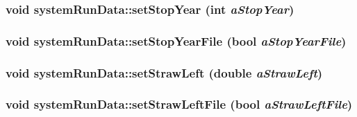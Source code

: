 \hypertarget{classsystem_run_data_afb3c83dc494b80a101de20b02225541c}{
\subsubsection[{setStopYear}]{\setlength{\rightskip}{0pt plus 5cm}void systemRunData::setStopYear (int {\em aStopYear})}}
\label{classsystem_run_data_afb3c83dc494b80a101de20b02225541c}
\hypertarget{classsystem_run_data_a673bf638a69369d131176b0a34085d4e}{
\subsubsection[{setStopYearFile}]{\setlength{\rightskip}{0pt plus 5cm}void systemRunData::setStopYearFile (bool {\em aStopYearFile})}}
\label{classsystem_run_data_a673bf638a69369d131176b0a34085d4e}
\hypertarget{classsystem_run_data_aef6a1426f24fa52826e79eb2176cb918}{
\subsubsection[{setStrawLeft}]{\setlength{\rightskip}{0pt plus 5cm}void systemRunData::setStrawLeft (double {\em aStrawLeft})}}
\label{classsystem_run_data_aef6a1426f24fa52826e79eb2176cb918}
\hypertarget{classsystem_run_data_ad6e404f37ef840ffa3ce14165ef90590}{
\subsubsection[{setStrawLeftFile}]{\setlength{\rightskip}{0pt plus 5cm}void systemRunData::setStrawLeftFile (bool {\em aStrawLeftFile})}}
\label{classsystem_run_data_ad6e404f37ef840ffa3ce14165ef90590}
